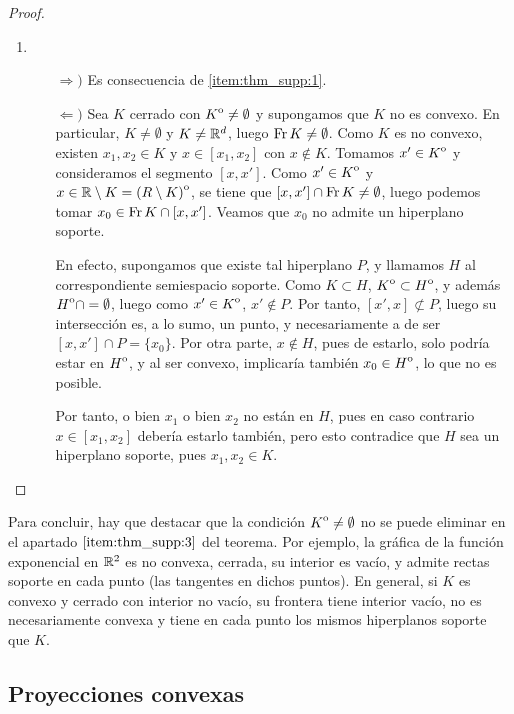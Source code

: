 \begin{proof}
\begin{enumerate}
        \item~
        \begin{enumerate}
            \item[$\Rightarrow)$] Es consecuencia de \ref{item:thm_supp:1}.

            \item[$\Leftarrow)$] Sea $K$ cerrado con ${\kern0ptK}^{\mathrm{o}} \ne \emptyset$ y supongamos que $K$ no es convexo. En particular, $K \ne \emptyset$ y $K \ne \mathbb{R}^d$, luego $\operatorname{Fr} K \ne \emptyset$. Como $K$ es no convexo, existen $x_1,x_2 \in K$ y $x \in [x_1,x_2]$ con $x \notin K$. Tomamos $x' \in {\kern0ptK}^{\mathrm{o}}$ y consideramos el segmento $[x,x']$. Como $x' \in {\kern0ptK}^{\mathrm{o}}$ y $x \in \mathbb{R}\setminus K = {\kern0pt(R\setminus K)}^{\mathrm{o}}$, se tiene que $[x,x']\cap\operatorname{Fr} K \ne \emptyset$, luego podemos tomar $x_0 \in \operatorname{Fr} K \cap [x,x']$. Veamos que $x_0$ no admite un hiperplano soporte.

            En efecto, supongamos que existe tal hiperplano $P$, y llamamos $H$ al correspondiente semiespacio soporte. Como $K \subset H$, ${\kern0ptK}^{\mathrm{o}} \subset {\kern0ptH}^{\mathrm{o}}$, y además ${\kern0ptH}^{\mathrm{o}} \cap = \emptyset$, luego como $x' \in {\kern0ptK}^{\mathrm{o}}$, $x' \notin P$. Por tanto, $[x',x]\not\subset P$, luego su intersección es, a lo sumo, un punto, y necesariamente a de ser $[x,x']\cap P = \{x_0\}$. Por otra parte, $x\notin H$, pues de estarlo, solo podría estar en ${\kern0ptH}^{\mathrm{o}}$, y al ser convexo, implicaría también $x_0 \in {\kern0ptH}^{\mathrm{o}}$, lo que no es posible.

            Por tanto, o bien $x_1$ o bien $x_2$ no están en $H$, pues en caso contrario $x \in [x_1,x_2]$ debería estarlo también, pero esto contradice que $H$ sea un hiperplano soporte, pues $x_1,x_2 \in K$.
        \end{enumerate}

    \end{enumerate}
\end{proof}

Para concluir, hay que destacar que la condición ${\kern0ptK}^{\mathrm{o}} \ne \emptyset$ no se puede eliminar en el apartado $\ref{item:thm_supp:3}$ del teorema. Por ejemplo, la gráfica de la función exponencial en $\mathbb{R}^2$ es no convexa, cerrada, su interior es vacío, y admite rectas soporte en cada punto (las tangentes en dichos puntos). En general, si $K$ es convexo y cerrado con interior no vacío, su frontera tiene interior vacío, no es necesariamente convexa y tiene en cada punto los mismos hiperplanos soporte que $K$.

\subsection{Proyecciones convexas}

